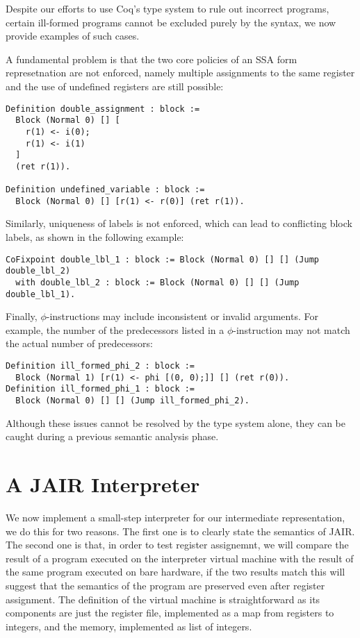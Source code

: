 Despite our efforts to use Coq's type system to rule out incorrect programs, certain ill-formed programs cannot be excluded purely by the syntax, we now provide examples of such cases.

A fundamental problem is that the two core policies of an SSA form represetnation are not enforced, namely multiple assignments to the same register and the use of undefined registers are still possible:

\begin{lstlisting}[style=Coq]
Definition double_assignment : block :=
  Block (Normal 0) [] [
    r(1) <- i(0);
    r(1) <- i(1)
  ]
  (ret r(1)).

Definition undefined_variable : block :=
  Block (Normal 0) [] [r(1) <- r(0)] (ret r(1)).
\end{lstlisting}

Similarly, uniqueness of labels is not enforced, which can lead to conflicting block labels, as shown in the following example:

\begin{lstlisting}[style=Coq]
CoFixpoint double_lbl_1 : block := Block (Normal 0) [] [] (Jump double_lbl_2)
  with double_lbl_2 : block := Block (Normal 0) [] [] (Jump double_lbl_1).
\end{lstlisting}

Finally, $\phi$-instructions may include inconsistent or invalid arguments. For example, the number of the predecessors listed in a $\phi$-instruction may not match the actual number of predecessors:

\begin{lstlisting}[style=Coq]
Definition ill_formed_phi_2 : block :=
  Block (Normal 1) [r(1) <- phi [(0, 0);]] [] (ret r(0)).
Definition ill_formed_phi_1 : block :=
  Block (Normal 0) [] [] (Jump ill_formed_phi_2).
\end{lstlisting}

Although these issues cannot be resolved by the type system alone, they can be caught during a previous semantic analysis phase.

\section{A JAIR Interpreter}
\label{sec:jair-int}

We now implement a small-step interpreter for our intermediate representation, we do this for two reasons.
The first one is to clearly state the semantics of JAIR. The second one is that, in order to test register assignemnt, we will compare the result of a program executed on the interpreter virtual machine with the result of the same program executed on bare hardware, if the two results match this will suggest that the semantics of the program are preserved even after register assignment.
The definition of the virtual machine is straightforward as its components are just the register file, implemented as a map from registers to integers, and the memory, implemented as list of integers.

